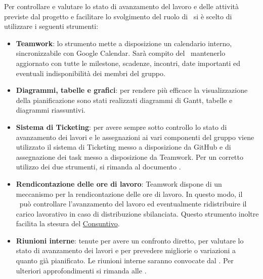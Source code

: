 \documentclass[../PianoProgetto.tex]{subfiles}
\begin{document}
Per controllare e valutare lo stato di avanzamento del lavoro e delle attività previste dal progetto e facilitare lo svolgimento del ruolo di \responsabilediprogetto\ si è scelto di utilizzare i seguenti strumenti:
	\begin{itemize}
	\item \textbf{Teamwork}: lo strumento mette a disposizione un calendario interno, sincronizzabile con Google Calendar. Sarà compito del \responsabilediprogetto\ mantenerlo aggiornato con tutte le milestone, scadenze, incontri, date importanti ed eventuali indisponibilità dei membri del gruppo.
	\item \textbf{Diagrammi, tabelle e grafici}: per rendere più efficace la visualizzazione della pianificazione sono stati realizzati diagrammi di Gantt, tabelle e diagrammi riassuntivi.
	\item \textbf{Sistema di Ticketing}: per avere sempre sotto controllo lo stato di avanzamento dei lavori e le assegnazioni ai vari componenti del gruppo viene utilizzato il sistema di Ticketing messo a disposizione da GitHub e di assegnazione dei task messo a disposizione da Teamwork. Per un corretto utilizzo dei due strumenti, si rimanda al documento \normediprogetto .
	\item \textbf{Rendicontazione delle ore di lavoro}: Teamwork dispone di un meccanismo per la rendicontazione delle ore di lavoro. In questo modo, il \responsabilediprogetto\ può controllare l'avanzamento del lavoro ed eventualmente ridistribuire il carico lavorativo in caso di distribuzione sbilanciata. Questo strumento inoltre facilita la stesura del \hyperref[sec:consuntivo]{Consuntivo}.
	\item \textbf{Riunioni interne}: tenute per avere un confronto diretto, per valutare lo stato di avanzamento dei lavori e per prevedere migliorie o variazioni a quanto già pianificato. Le riunioni interne saranno convocate dal \responsabilediprogetto . Per ulteriori approfondimenti si rimanda alle \normediprogetto .
	\end{itemize}
	
\end{document}
